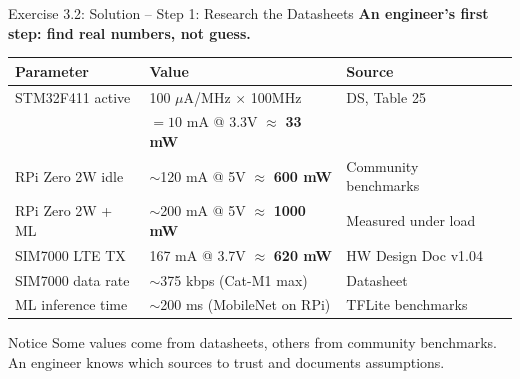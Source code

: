 \documentclass[aspectratio=169,11pt]{beamer}
\begin{document}
\begin{frame}{Exercise 3.2: Solution -- Step 1: Research the Datasheets}
    \textbf{An engineer's first step: find real numbers, not guess.}
    
    \vspace{0.2cm}
    \begin{center}
    \begin{tabular}{llll}
        \toprule
        \textbf{Parameter} & \textbf{Value} & \textbf{Source} \\
        \midrule
        STM32F411 active & 100 $\mu$A/MHz $\times$ 100MHz & DS, Table 25 \\
        & $= 10$ mA @ 3.3V $\approx$ \textbf{33 mW} & \\
        \addlinespace
        RPi Zero 2W idle & $\sim$120 mA @ 5V $\approx$ \textbf{600 mW} & Community benchmarks \\
        RPi Zero 2W + ML & $\sim$200 mA @ 5V $\approx$ \textbf{1000 mW} & Measured under load \\
        \addlinespace
        SIM7000 LTE TX & 167 mA @ 3.7V $\approx$ \textbf{620 mW} & HW Design Doc v1.04 \\
        SIM7000 data rate & $\sim$375 kbps (Cat-M1 max) & Datasheet \\
        ML inference time & $\sim$200 ms (MobileNet on RPi) & TFLite benchmarks \\
        \bottomrule
    \end{tabular}
    \end{center}
    
    \vspace{0.2cm}
    \begin{alertblock}{Notice}
        Some values come from datasheets, others from community benchmarks. An engineer knows which sources to trust and documents assumptions.
    \end{alertblock}
\end{frame}
\end{document}

